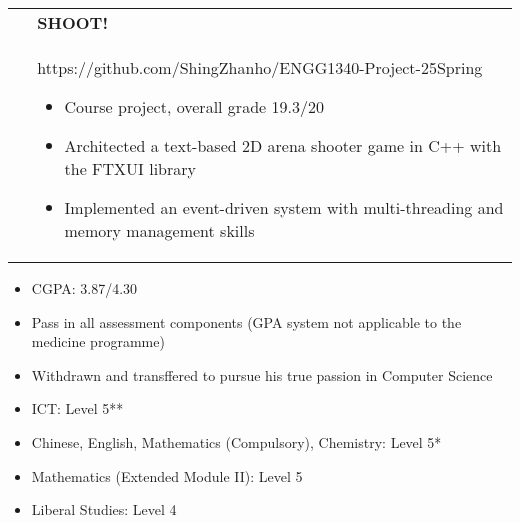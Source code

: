 \documentclass[10pt,a4paper,withhypeper,normalphoto]{altacv}
\makeatletter
\newcommand{\cvachievementAlt}[3]{%
  \begin{tabularx}{\linewidth}{@{}p{2em} @{\hspace{1ex}} >{\raggedright\arraybackslash}X@{}}
  \multirow{2}{*}{\,\,\Large\color{accent}#1} & \bfseries\textcolor{emphasis}{#2}\\
  & #3
  \end{tabularx}%
  \smallskip
}
\makeatother
\begin{document}
\begin{paracol}{2}
\divider

\cvachievementAlt{\simpleicon{cplusplus}}{SHOOT!}{
{\small https://github.com/ShingZhanho/ENGG1340-Project-25Spring}
\begin{itemize}
  \item Course project, overall grade 19.3/20
  \item Architected a text-based 2D arena shooter game in C++ with the FTXUI library
  \item Implemented an event-driven system with multi-threading and memory management skills
\end{itemize}
}


\switchcolumn



\begin{itemize}
  \item CGPA: 3.87/4.30
\end{itemize}

\divider

\begin{itemize}
  \item Pass in all assessment components (GPA system not applicable to the medicine programme)
  \item Withdrawn and transffered to pursue his true passion in Computer Science
\end{itemize}

\divider

\begin{itemize}
  \item ICT: Level 5**
  \item Chinese, English, Mathematics (Compulsory),
  Chemistry: Level 5*
  \item Mathematics (Extended Module II): Level 5
  \item Liberal Studies: Level 4
\end{itemize}



\end{paracol}
\end{document}
